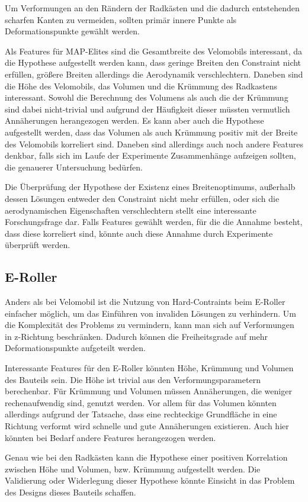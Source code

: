 \documentclass[12pt]{article}
\begin{document}
Um Verformungen an den Rändern der Radkästen und die dadurch entstehenden scharfen Kanten zu vermeiden, sollten primär innere Punkte als Deformationspunkte gewählt werden.

Als Features für MAP-Elites sind die Gesamtbreite des Velomobils interessant, da die Hypothese aufgestellt werden kann, dass geringe Breiten den Constraint nicht erfüllen, größere Breiten allerdings die Aerodynamik verschlechtern.
Daneben sind die Höhe des Velomobils, das Volumen und die Krümmung des Radkastens interessant.
Sowohl die Berechnung des Volumens als auch die der Krümmung sind dabei nicht-trivial und aufgrund der Häufigkeit dieser müssten vermutlich Annäherungen herangezogen werden.
Es kann aber auch die Hypothese aufgestellt werden, dass das Volumen als auch Krümmung positiv mit der Breite des Velomobils korreliert sind.
Daneben sind allerdings auch noch andere Features denkbar, falls sich im Laufe der Experimente Zusammenhänge aufzeigen sollten, die genauerer Untersuchung bedürfen.

Die Überprüfung der Hypothese der Existenz eines Breitenoptimums, außerhalb dessen Lösungen entweder den Constraint nicht mehr erfüllen, oder sich die aerodynamischen Eigenschaften verschlechtern stellt eine interessante Forschungsfrage dar.
Falls Features gewählt werden, für die die Annahme besteht, dass diese korreliert sind, könnte auch diese Annahme durch Experimente überprüft werden.

\subsection{E-Roller}
Anders als bei Velomobil ist die Nutzung von Hard-Contraints beim E-Roller einfacher möglich, um das Einführen von invaliden Lösungen zu verhindern.
Um die Komplexität des Problems zu vermindern, kann man sich auf Verformungen in z-Richtung beschränken.
Dadurch können die Freiheitsgrade auf mehr Deformationspunkte aufgeteilt werden.

Interessante Features für den E-Roller könnten Höhe, Krümmung und Volumen des Bauteils sein.
Die Höhe ist trivial aus den Verformungsparametern berechenbar.
Für Krümmung und Volumen müssen Annäherungen, die weniger rechenaufwendig sind, genutzt werden.
Vor allem für das Volumen könnten allerdings aufgrund der Tatsache, dass eine rechteckige Grundfläche in eine Richtung verformt wird schnelle und gute Annäherungen existieren.
Auch hier könnten bei Bedarf andere Features herangezogen werden.

Genau wie bei den Radkästen kann die Hypothese einer positiven Korrelation zwischen Höhe und Volumen, bzw. Krümmung aufgestellt werden.
Die Validierung oder Widerlegung dieser Hypothese könnte Einsicht in das Problem des Designs dieses Bauteils schaffen.
\end{document}
